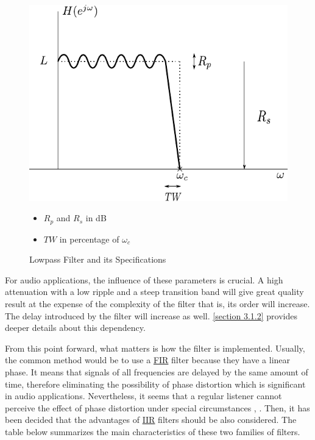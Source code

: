 \begin{figure}[ht]
\noindent\begin{minipage}{0.6\textwidth}
	\includegraphics[scale=0.65]{filter_specs.pdf}
	\raggedleft
	
\end{minipage}%
\hfill%
\begin{minipage}{0.35\textwidth}\raggedright
	\begin{itemize}
		\item $R_p$ and $R_s$ in \si{dB}
		\item $TW$ in percentage of $\omega_c$
	\end{itemize}
\end{minipage}
\caption{Lowpass Filter and its Specifications}\label{Figure 3.5}
\end{figure}
\newpage

For audio applications, the influence of these parameters is crucial. A high attenuation with a low ripple and a steep transition band will give great quality result at the expense of the complexity of the filter that is, its order will increase. The delay introduced by the filter will increase as well. \ref{section 3.1.2} provides deeper details about this dependency.  

From this point forward, what matters is how the filter is implemented. Usually, the common method would be to use a \hyperlink{FIR}{FIR} filter because they have a linear phase. It means that signals of all frequencies are delayed by the same amount of time, therefore eliminating the possibility of phase distortion which is significant in audio applications. Nevertheless, it seems \cite{toole} that a regular listener cannot perceive the effect of phase distortion under special circumstances \cite{hartmann}, \cite{lipshitz}. Then, it has been decided that the advantages of \hyperlink{IIR}{IIR} filters should be also considered. The table below summarizes the main characteristics of these two families of filters.

